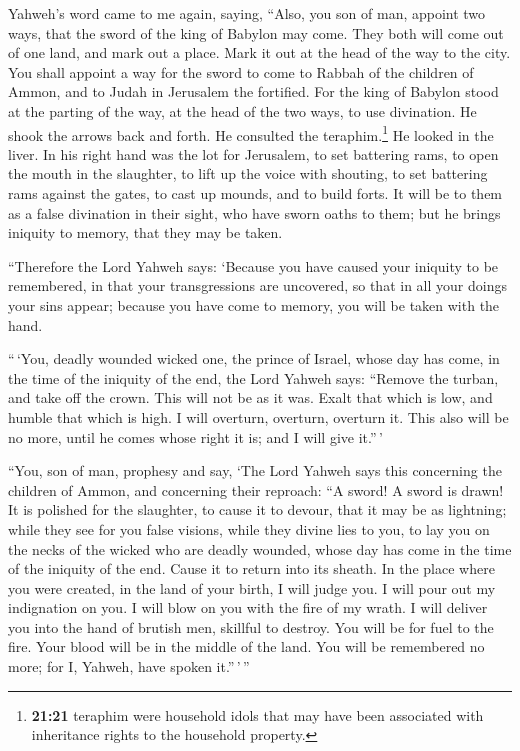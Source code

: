  Yahweh's word came to me again, saying, 
``Also, you son of man, appoint two ways, that the sword of the king of
Babylon may come. They both will come out of one land, and mark out a
place. Mark it out at the head of the way to the city. 
You shall appoint a way for the sword to come to Rabbah of the children
of Ammon, and to Judah in Jerusalem the fortified.  For
the king of Babylon stood at the parting of the way, at the head of the
two ways, to use divination. He shook the arrows back and forth. He
consulted the teraphim.\footnote{\textbf{21:21} teraphim were household
  idols that may have been associated with inheritance rights to the
  household property.} He looked in the liver.  In his
right hand was the lot for Jerusalem, to set battering rams, to open the
mouth in the slaughter, to lift up the voice with shouting, to set
battering rams against the gates, to cast up mounds, and to build forts.
 It will be to them as a false divination in their sight,
who have sworn oaths to them; but he brings iniquity to memory, that
they may be taken.

 ``Therefore the Lord Yahweh says: `Because you have
caused your iniquity to be remembered, in that your transgressions are
uncovered, so that in all your doings your sins appear; because you have
come to memory, you will be taken with the hand.

 ``\,`You, deadly wounded wicked one, the prince of
Israel, whose day has come, in the time of the iniquity of the end,
 the Lord Yahweh says: ``Remove the turban, and take off
the crown. This will not be as it was. Exalt that which is low, and
humble that which is high.  I will overturn, overturn,
overturn it. This also will be no more, until he comes whose right it
is; and I will give it.''\,'

 ``You, son of man, prophesy and say, `The Lord Yahweh
says this concerning the children of Ammon, and concerning their
reproach: ``A sword! A sword is drawn! It is polished for the slaughter,
to cause it to devour, that it may be as lightning; 
while they see for you false visions, while they divine lies to you, to
lay you on the necks of the wicked who are deadly wounded, whose day has
come in the time of the iniquity of the end.  Cause it to
return into its sheath. In the place where you were created, in the land
of your birth, I will judge you.  I will pour out my
indignation on you. I will blow on you with the fire of my wrath. I will
deliver you into the hand of brutish men, skillful to destroy.
 You will be for fuel to the fire. Your blood will be in
the middle of the land. You will be remembered no more; for I, Yahweh,
have spoken it.''\,'\,''


